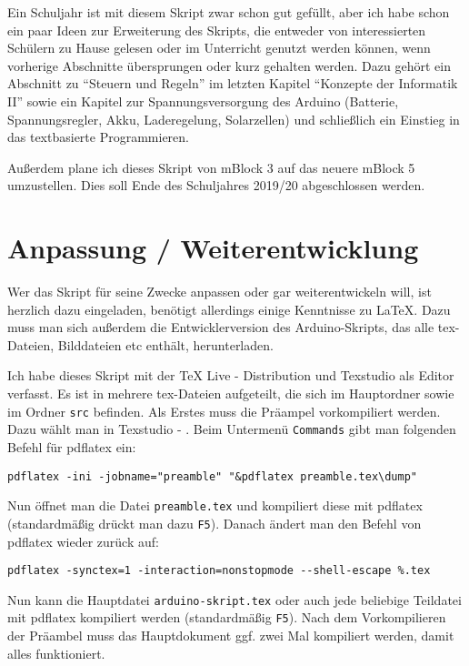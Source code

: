 Ein Schuljahr ist mit diesem Skript zwar schon gut gefüllt, aber ich habe schon ein paar Ideen zur Erweiterung des Skripts, die entweder von interessierten Schülern zu Hause gelesen oder im Unterricht genutzt werden können, wenn vorherige Abschnitte übersprungen oder kurz gehalten werden. Dazu gehört ein Abschnitt zu \enquote{Steuern und Regeln} im letzten Kapitel \enquote{Konzepte der Informatik II} sowie ein Kapitel zur Spannungsversorgung des Arduino (Batterie, Spannungsregler, Akku, Laderegelung, Solarzellen) und schließlich ein Einstieg in das textbasierte Programmieren.

Außerdem plane ich dieses Skript von mBlock 3 auf das neuere mBlock 5 umzustellen. Dies soll Ende des Schuljahres 2019/20 abgeschlossen werden.

\section{Anpassung / Weiterentwicklung}

Wer das Skript für seine Zwecke anpassen oder gar weiterentwickeln will, ist herzlich dazu eingeladen, benötigt allerdings einige Kenntnisse zu \LaTeX. Dazu muss man sich außerdem die Entwicklerversion des Arduino-Skripts, das alle tex-Dateien, Bilddateien etc enthält, herunterladen.

Ich habe dieses Skript mit der TeX Live - Distribution und Texstudio als Editor verfasst. Es ist in mehrere tex-Dateien aufgeteilt, die sich im Hauptordner sowie im Ordner \texttt{src} befinden. Als Erstes muss die Präampel vorkompiliert werden. Dazu wählt man in Texstudio  - . Beim Untermenü \texttt{Commands} gibt man folgenden Befehl für pdflatex ein:

\medskip
\verb|pdflatex -ini -jobname="preamble" "&pdflatex preamble.tex\dump"|

\bigskip
Nun öffnet man die Datei \texttt{preamble.tex} und kompiliert diese mit pdflatex (standardmäßig drückt man dazu \texttt{F5}). Danach ändert man den Befehl von pdflatex wieder zurück auf:

\bigskip
\verb|pdflatex -synctex=1 -interaction=nonstopmode --shell-escape %.tex|
\bigskip

Nun kann die Hauptdatei \texttt{arduino-skript.tex} oder auch jede beliebige Teildatei mit pdflatex kompiliert werden (standardmäßig \texttt{F5}). Nach dem Vorkompilieren der Präambel muss das Hauptdokument ggf. zwei Mal kompiliert werden, damit alles funktioniert.

